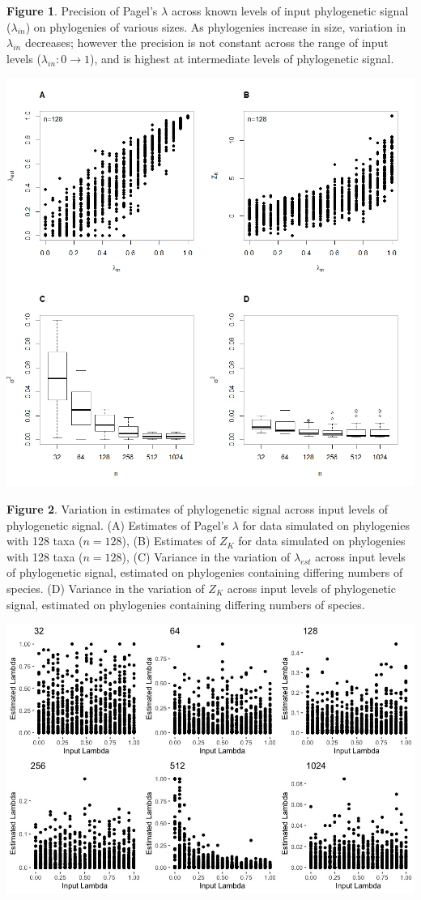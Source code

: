 \documentclass[
]{article}
\begin{document}
\singlespacing \textbf{Figure 1}. Precision of Pagel's \(\lambda\)
across known levels of input phylogenetic signal (\(\lambda_{in}\)) on
phylogenies of various sizes. As phylogenies increase in size, variation
in \(\lambda_{in}\) decreases; however the precision is not constant
across the range of input levels (\(\lambda_{in}: 0 \to 1\)), and is
highest at intermediate levels of phylogenetic signal.

\newpage

\includegraphics[width=0.95\linewidth]{Fig2}

\singlespacing \textbf{Figure 2}. Variation in estimates of phylogenetic
signal across input levels of phylogenetic signal. (A) Estimates of
Pagel's \(\lambda\) for data simulated on phylogenies with 128 taxa
(\(n=128\)), (B) Estimates of \(Z_K\) for data simulated on phylogenies
with 128 taxa (\(n=128\)), (C) Variance in the variation of
\(\lambda_{est}\) across input levels of phylogenetic signal, estimated
on phylogenies containing differing numbers of species. (D) Variance in
the variation of \(Z_K\) across input levels of phylogenetic signal,
estimated on phylogenies containing differing numbers of species.

\newpage

\includegraphics[width=0.95\linewidth]{Fig3}
\end{document}
